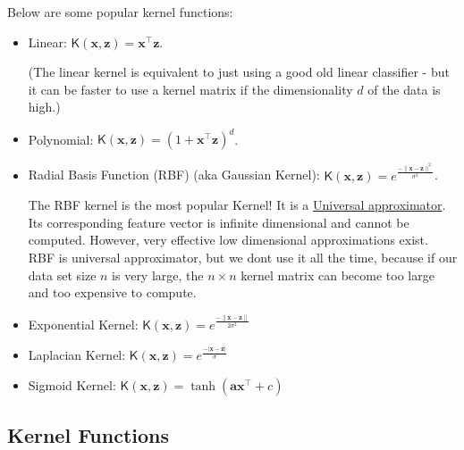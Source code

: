 \documentclass[12pt]{article}
\begin{document}
 Below are some popular kernel functions: 
 \begin{itemize}
\item Linear: $\mathsf{K}(\mathbf{x},\mathbf{z})=\mathbf{x}^\top \mathbf{z}$.
 
 (The linear kernel is equivalent to just using a good old linear classifier - but it can be faster to use a kernel matrix if the dimensionality $d$ of the data is high.)
 
 \item Polynomial: $\mathsf{K}(\mathbf{x},\mathbf{z})=(1+\mathbf{x}^\top \mathbf{z})^d$.
 
 \item Radial Basis Function (RBF) (aka Gaussian Kernel): $\mathsf{K}(\mathbf{x},\mathbf{z})= e^\frac{-\|\mathbf{x}-\mathbf{z}\|^2}{\sigma^2}$.
 
 The RBF kernel is the most popular Kernel! It is a \href{"https://en.wikipedia.org/wiki/Universal_approximation_theorem}{Universal approximator}. Its corresponding feature vector is infinite dimensional and cannot be computed. However, very effective low dimensional approximations exist.
  RBF is universal approximator, but we dont  use it all the time, because if our data set size $n$ is very large, the $n\times n$ kernel matrix can become too large and too expensive to compute.
 
 
 \item Exponential Kernel: $\mathsf{K}(\mathbf{x},\mathbf{z})= e^\frac{-\| \mathbf{x}-\mathbf{z}\|}{2\sigma^2}$
 
\item  Laplacian Kernel: $\mathsf{K}(\mathbf{x},\mathbf{z})= e^\frac{-| \mathbf{x}-\mathbf{z}|}{\sigma}$
 
 \item Sigmoid Kernel: $\mathsf{K}(\mathbf{x},\mathbf{z})=\tanh(\mathbf{a}\mathbf{x}^\top  + c)$
 
\end{itemize}
 
  
  \subsection{Kernel Functions}
  
\end{document}
